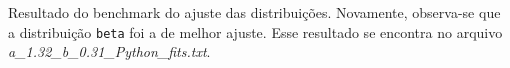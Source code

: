 \clearpage 

\begin{figure}[ht!]
	\vspace{0mm}	%
	\begin{center}
	\end{center}
	\vspace{-2mm}	%
	\label{ex4_fig1}
\end{figure}

Resultado do benchmark do ajuste das distribuições. Novamente, observa-se que a distribuição \texttt{beta} foi a de melhor ajuste. Esse resultado se encontra no arquivo \textit{a\_1.32\_b\_0.31\_Python\_fits.txt}.

